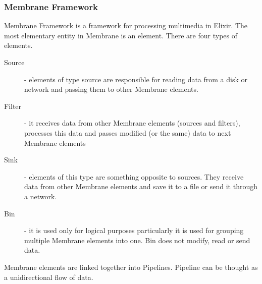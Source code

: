 \subsubsection{Membrane Framework}
Membrane Framework is a framework for processing multimedia in Elixir.
The most elementary entity in Membrane is an element.
There are four types of elements.
\begin{description}
    \item [Source] - elements of type source are responsible for reading data from a disk or network and passing them to
    other Membrane elements.
    \item [Filter] - it receives data from other Membrane elements (sources and filters), processes this data and passes
    modified (or the same) data to next Membrane elements
    \item [Sink] - elements of this type are something opposite to sources.
    They receive data from other Membrane elements and save it to a file or send it through a network.
    \item [Bin] - it is used only for logical purposes particularly it is used for grouping multiple Membrane elements into one.
    Bin does not modify, read or send data.
\end{description}
Membrane elements are linked together into Pipelines.
Pipeline can be thought as a unidirectional flow of data.

